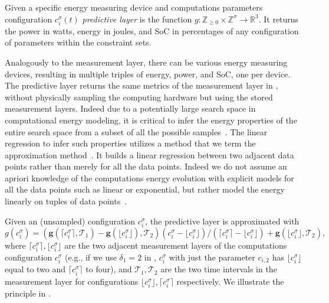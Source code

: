 \begin{highlight}
  \begin{defn}\label{def:comp-ener}
    Given a specific energy measuring device and computations parameters configuration $c_i^\sigma(t)$ \textit{predictive layer} is the function $g:\mathbb{Z}_{\geq 0}\times\mathbb{Z}^\sigma\rightarrow\mathbb{R}^3$. It returns the power in watts, energy in joules, and SoC in percentages of any configuration of parameters within the constraint sets.
  \end{defn}
\end{highlight}

Analogously to the measurement layer, there can be various energy measuring devices, resulting in multiple triples of energy, power, and SoC, one per device. The predictive layer returns the same metrics of the measurement layer in , without physically sampling the computing hardware but using the stored measurement layers. Indeed due to a potentially large search space in computational energy modeling, it is critical to infer the energy properties of the entire search space from a subset of all the possible samples~\citep{lee2006statistically,lee2006accurate,bailey2014adaptive}. The linear regression to infer such properties utilizes a method that we term the approximation method~\citep{seewald2019coarse}. It builds a linear regression between two adjacent data points rather than merely for all the data points. Indeed we do not assume an apriori knowledge of the computations energy evolution with explicit models for all the data points such as linear or exponential, but rather model the energy linearly on tuples of data points~\citep{seewald2019coarse}.

Given an (unsampled) configuration $c_i^\sigma$, the predictive layer is approximated with
\begin{equation}
  g(c_i^\sigma)=(\mathbf{g}(\lceil c_i^\sigma\rceil,\mathcal{T}_1)-\mathbf{g}(\lfloor c_i^\sigma\rfloor),\mathcal{T}_2)(c_i^\sigma-\lfloor c_i^\sigma\rfloor)/(\lceil c_i^\sigma\rceil-\lfloor c_i^\sigma\rfloor)+\mathbf{g}(\lfloor c_i^\sigma\rfloor,\mathcal{T}_2),
\end{equation}
where $\lceil c_i^\sigma\rceil,\lfloor c_i^\sigma\rfloor$ are the two adjacent measurement layers of the computations configuration $c_i^\sigma$ (e.g., if we use $\delta_1=2$ in , $c_i^\sigma$ with just the parameter $c_{i,2}$ has $\lfloor c_i^\sigma\rfloor$ equal to two and $\lceil c_i^\sigma\rceil$ to four), and $\mathcal{T}_1,\mathcal{T}_2$ are the two time intervals in the measurement layer for configurations $\lfloor c_i^\sigma\rfloor,\lceil c_i^\sigma\rceil$ respectively.
We illustrate the principle in . %

